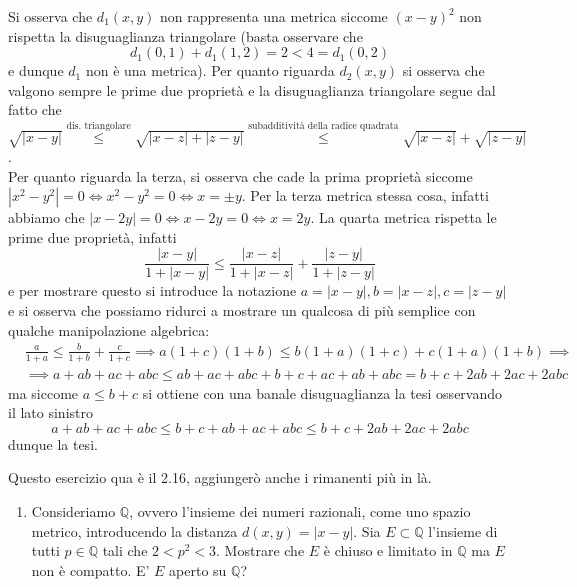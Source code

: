 \documentclass{report}
\begin{document}
\begin{mysolution}
Si osserva che $d_1(x, y)$ non rappresenta una metrica siccome $(x-y)^2$ non rispetta la disuguaglianza triangolare (basta osservare che $$d_1(0, 1) + d_1(1, 2) = 2 < 4 = d_1(0, 2) $$ e dunque $d_1$ non è una metrica). Per quanto riguarda $d_2(x, y)$ si osserva che valgono sempre le prime due proprietà e la disuguaglianza triangolare segue dal fatto che $\sqrt{|x-y|} \stackrel{\text{dis. triangolare}}{\leq} \sqrt{|x-z| + |z-y|} \stackrel{\text{subadditività della radice quadrata}}{\leq} \sqrt{|x-z|} + \sqrt{|z-y|}$. \\
Per quanto riguarda la terza, si osserva che cade la prima proprietà siccome $|x^2-y^2| = 0 \iff x^2 - y^2 = 0 \iff x = \pm y$. Per la terza metrica stessa cosa, infatti abbiamo che $|x-2y| = 0 \iff x-2y = 0 \iff x = 2y$. La quarta metrica rispetta le prime due proprietà, infatti
$$
\frac{|x-y|}{1 + |x-y|} \leq \frac{|x-z|}{1+|x-z|} + \frac{|z-y|}{1 + |z-y|}
$$
e per mostrare questo si introduce la notazione $a = |x-y|, b = |x-z|, c = |z-y|$ e si osserva che possiamo ridurci a mostrare un qualcosa di più semplice con qualche manipolazione algebrica:
\begin{align*}
	&\frac{a}{1+a} \leq \frac{b}{1+b} + \frac{c}{1+c} \implies a(1+c)(1+b) \leq b(1+a)(1+c) + c(1+a)(1+b) \implies \\ &\implies a + ab + ac + abc \leq ab + ac + abc + b + c + ac + ab + abc = b+c+2ab+2ac+2abc
\end{align*}
ma siccome $a\leq b + c$ si ottiene con una banale disuguaglianza la tesi osservando il lato sinistro
$$
a + ab + ac + abc \leq b + c + ab + ac + abc \leq b+c+2ab+2ac+2abc
$$
dunque la tesi.
\end{mysolution}
Questo esercizio qua è il 2.16, aggiungerò anche i rimanenti più in là.
\begin{enumerate}[resume, label=\protect\circled{\arabic*}]
	\item Consideriamo $\mathbb{Q}$, ovvero l'insieme dei numeri razionali, come uno spazio metrico, introducendo la distanza $d(x, y)= |x-y|$. Sia $E \subset \mathbb{Q}$ l'insieme di tutti $p \in \mathbb{Q}$ tali che $2 < p^2 < 3$. Mostrare che $E$ è chiuso e limitato in $\mathbb{Q}$ ma $E$ non è compatto. E' $E$ aperto su $\mathbb{Q}$?
\end{enumerate}
\end{document}
